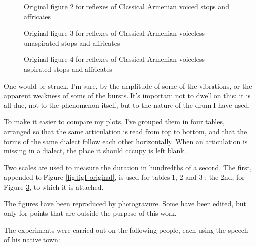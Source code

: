 \begin{figure}
	\centering
	\caption{Original figure 2 for reflexes of Classical Armenian voiced stops and affricates}
	\label{fig:fig2 original}
\end{figure}


\begin{figure}
	\centering
	\caption{Original figure 3 for reflexes of Classical Armenian voiceless unaspirated stops and affricates}
	\label{fig:fig3 original}
\end{figure}


\begin{figure}
	\centering
	\caption{Original figure 4 for reflexes of Classical Armenian voiceless aspirated stops and affricates}
	\label{fig:fig4 original}
\end{figure}



One would be struck, I'm sure, by the amplitude of some of the vibrations, or the apparent weakness of some of the bursts. It's important not to dwell on this: it is all due, not to the phenomenon itself, but to the nature of the drum I have used.

To make it easier to compare my plots, I've grouped them in four tables, arranged so that the same articulation is read from top to bottom, and that the forms of the same dialect follow each other horizontally. When an articulation is missing in a dialect, the place it should occupy is left blank.

Two scales are used to measure the duration in hundredths of a second. The first, appended to Figure \ref{fig:fig1 original}, is used for tables 1, 2 and 3 ; the 2nd, for Figure \ref{fig:fig4 original}, to which it is attached.

The figures have been reproduced by photogravure. Some have been edited, but only for points that are outside the purpose of this work.

The experiments were carried out on the following people, each using the speech of his native town:

